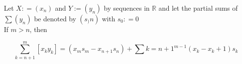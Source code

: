 \documentclass{article}
\begin{document}
Let $X: = \left( x_n \right)$ and $Y:= \left( y_n \right)$ by sequences in $\mathbb{R}$ and let the partial sums of $\sum\left( y_n \right)$ be denoted by $\left( s_)n \right)$ with $s_0 : = 0$ \\

If $m>n$, then

\begin{equation}
  \sum_{k=n+1}^{m}\left[ x_ky_k \right]=\left( x_ms_m - x_{n+1}s_n \right) + \sum{k=n+1}^{m-1}\left( x_k-x_k+1 \right)s_k
  \label{partsum}
\end{equation}
\end{document}
